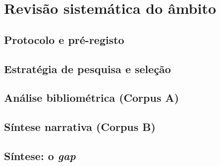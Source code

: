 
\chapter{Revisão sistemática do âmbito}
\label{cha:revisao}

\section{Protocolo e pré-registo}
\label{sec:protocolo-sr}



\section{Estratégia de pesquisa e seleção}
\label{sec:pesquisa}



\section{Análise bibliométrica (Corpus A)}
\label{sec:corpus-a}



\section{Síntese narrativa (Corpus B)}
\label{sec:corpus-b}



\section{Síntese: o \emph{gap}}
\label{sec:gap}



